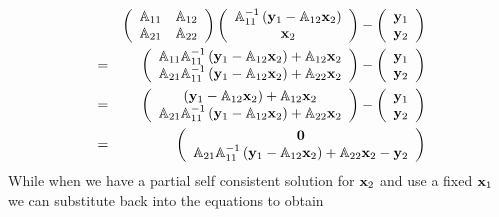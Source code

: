 \begin{eqnarray}
&&\left( 
\begin{array}{cc}
{\Bbb A}_{11} & {\Bbb A}_{12} \\ 
{\Bbb A}_{21} & {\Bbb A}_{22}%
\end{array}%
\right) \left( 
\begin{array}{c}
{\Bbb A}_{11}^{-1}\left( {\bf y}_{1}-{\Bbb A}_{12}{\bf x}_{2}\right) \\ 
{\bf x}_{2}%
\end{array}%
\right) -\left( 
\begin{array}{c}
{\bf y}_{1} \\ 
{\bf y}_{2}%
\end{array}%
\right)  \nonumber \\
&=&\left( 
\begin{array}{c}
{\Bbb A}_{11}{\Bbb A}_{11}^{-1}\left( {\bf y}_{1}-{\Bbb A}_{12}{\bf x}%
_{2}\right) +{\Bbb A}_{12}{\bf x}_{2} \\ 
{\Bbb A}_{21}{\Bbb A}_{11}^{-1}\left( {\bf y}_{1}-{\Bbb A}_{12}{\bf x}%
_{2}\right) +{\Bbb A}_{22}{\bf x}_{2}%
\end{array}%
\right) -\left( 
\begin{array}{c}
{\bf y}_{1} \\ 
{\bf y}_{2}%
\end{array}%
\right)  \nonumber \\
&=&\left( 
\begin{array}{c}
\left( {\bf y}_{1}-{\Bbb A}_{12}{\bf x}_{2}\right) +{\Bbb A}_{12}{\bf x}_{2}
\\ 
{\Bbb A}_{21}{\Bbb A}_{11}^{-1}\left( {\bf y}_{1}-{\Bbb A}_{12}{\bf x}%
_{2}\right) +{\Bbb A}_{22}{\bf x}_{2}%
\end{array}%
\right) -\left( 
\begin{array}{c}
{\bf y}_{1} \\ 
{\bf y}_{2}%
\end{array}%
\right)  \nonumber \\
&=&\left( 
\begin{array}{c}
{\bf 0} \\ 
{\Bbb A}_{21}{\Bbb A}_{11}^{-1}\left( {\bf y}_{1}-{\Bbb A}_{12}{\bf x}%
_{2}\right) +{\Bbb A}_{22}{\bf x}_{2}-{\bf y}_{2}%
\end{array}%
\right)  \label{baksub1}
\end{eqnarray}%
While when we have a partial self consistent solution for ${\bf x}_{2}$ and
use a fixed ${\bf x}_{1}$ we can substitute back into the equations to
obtain 
